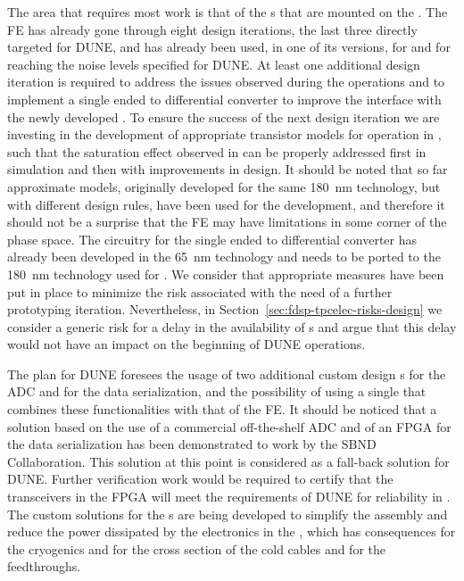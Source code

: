 The area that requires most work is that of the s that are mounted
on the . The FE  has already gone through eight design
iterations, the last three directly targeted for DUNE, and has already been used, 
in one of its versions, for  and for  reaching the 
noise levels specified for DUNE. At least one additional design iteration is
required to address the issues observed during the  operations and
to implement a single ended to differential converter to improve the interface
with the newly developed . To ensure the success of the next 
design iteration we are investing in the development of appropriate transistor
models for operation in \lar, such that the saturation effect observed in 
 can be properly addressed first in simulation and then with improvements 
in design. It should be noted that so far approximate models, originally developed for 
the same \SI{180}{nm} technology, but with different design rules, have been used for 
the  development, and therefore it should not be a surprise
that the FE  may have limitations in some corner of the phase space.
The circuitry for the single ended to differential converter has already been 
developed in the \SI{65}{nm} technology and needs to be ported to the \SI{180}{nm}
technology used for . We consider that appropriate measures have been
put in place to minimize the risk associated with the need of a further
prototyping iteration. Nevertheless, in Section~\ref{sec:fdsp-tpcelec-risks-design}
we consider a generic risk for a delay in the availability of s and
argue that this delay would not have an impact on the beginning of DUNE operations.

The plan for DUNE foresees the usage of two additional custom design s
for the ADC and for the data serialization, and the possibility of using a single 
 that combines these functionalities with that of the FE. It should
be noticed that a solution based on the use of a commercial off-the-shelf ADC 
and of an FPGA for the data serialization has been demonstrated to work by the 
SBND Collaboration. This solution at this point is considered as a fall-back
solution for DUNE. Further verification work would be required to certify that
the transceivers in the FPGA will meet the requirements of DUNE for reliability
in \lar. The custom solutions for the s are being developed to
simplify the  assembly and reduce the power dissipated by the
electronics in the \lar, which has consequences for the cryogenics and for
the cross section of the cold cables and for the feedthroughs.

